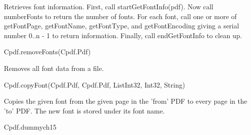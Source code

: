 Retrieves font information. First, call startGetFontInfo(pdf). Now
call numberFonts to return the number of fonts. For each font, call
one or more of getFontPage, getFontName, getFontType, and
getFontEncoding giving a serial number 0..n - 1 to
return information. Finally, call endGetFontInfo to clean up.


Cpdf.removeFonts(Cpdf.Pdf)


Removes all font data from a file.


Cpdf.copyFont(Cpdf.Pdf, Cpdf.Pdf, List{Int32}, Int32, String)


Copies the given font
from the given page in the 'from' PDF to every page in the 'to' PDF. The
new font is stored under its font name.


Cpdf.dummych15

